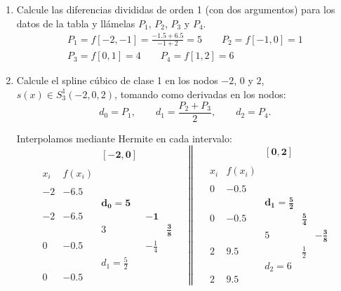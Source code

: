 \documentclass[12pt]{article}
\begin{document}
\begin{ejercicio}
\begin{enumerate}
        \item Calcule las diferencias divididas de orden 1 (con dos argumentos) para los datos de la tabla y llámelas $P_1$, $P_2$, $P_3$ y $P_4$.
        \begin{gather*}
            P_1 = f[-2, -1] = \frac{-1.5+6.5}{-1+2} = 5
            \qquad
            P_2 = f[-1, 0] = 1
            \\
            P_3 = f[0,1] = 4
            \qquad
            P_4 = f[1,2] = 6
        \end{gather*}

        \item Calcule el spline cúbico de clase 1 en los nodos $-2$, $0$ y $2$, $s(x)\in S^1_3 (-2, 0, 2)$, tomando como derivadas en los nodos:
        \begin{equation*}
            d_0 = P_1,\qquad d_1=\frac{P_2+P_3}{2}, \qquad d_2=P_4.
        \end{equation*}

        Interpolamos mediante Hermite en cada intervalo:
        \begin{equation*}
            \begin{array}{c|cccc}
                &&\mathbf{[-2, 0]} \\ \\
                x_i & f(x_i) \\ \\
                -2 & \mathbf{-6.5} \\
                && \mathbf{d_0=5}\\
                -2 & -6.5 && \mathbf{-1}\\
                && 3 && \mathbf{\frac{3}{8}}\\ 
                0 & -0.5 && -\frac{1}{4}\\
                && d_1=\frac{5}{2}\\
                0 & -0.5
            \end{array}
            \quad \left\|\quad
            \begin{array}{c|cccc}
                &&\mathbf{[0,2]} \\ \\
                x_i & f(x_i) \\ \\
                0 & \mathbf{-0.5} \\
                && \mathbf{d_1=\frac{5}{2}}\\
                0 & -0.5 && \mathbf{\frac{5}{4}}\\
                && 5 && \mathbf{-\frac{3}{8}}\\ 
                2 & 9.5 && \frac{1}{2}\\
                && d_2=6\\
                2 & 9.5
            \end{array}\right.
        \end{equation*}
    

\end{enumerate}
\end{ejercicio}
\end{document}
